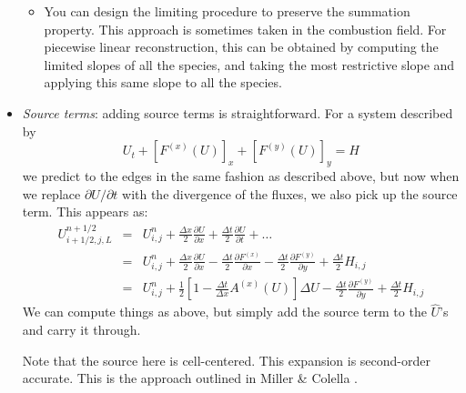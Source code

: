 \begin{itemize}
\begin{itemize}
\item You can design the limiting procedure to preserve the summation
property.  This approach is sometimes taken in the combustion field. 
For piecewise linear reconstruction, this can be obtained by computing
the limited slopes of all the species, and taking the most restrictive
slope and applying this same slope to all the species.
\end{itemize}

\item {\em Source terms}: adding source terms is straightforward.  For
a system described by
\begin{equation}
U_t + [F^{(x)}(U)]_x + [F^{(y)}(U)]_y = H
\end{equation}
we predict to the edges in the same fashion as described above, but now
when we replace $\partial U/\partial t$ with the divergence of the
fluxes, we also pick up the source term.  This appears as:
\begin{eqnarray}
U_{i+1/2,j,L}^{n+1/2} &=& U_{i,j}^n 
            + \frac{\Delta x}{2} \frac{\partial U}{\partial x} 
            + \frac{\Delta t}{2} \frac{\partial U}{\partial t} + \ldots \\
&=& U_{i,j}^n + \frac{\Delta x}{2} \frac{\partial U}{\partial x} 
              - \frac{\Delta t}{2} \frac{\partial F^{(x)}}{\partial x} 
              - \frac{\Delta t}{2} \frac{\partial F^{(y)}}{\partial y} 
              + \frac{\Delta t}{2} H_{i,j} \\
&=& U_{i,j}^n 
 + \frac{1}{2} \left [1 -\frac{\Delta t}{\Delta x} A^{(x)}(U)\right ] \Delta U 
 - \frac{\Delta t}{2} \frac{\partial F^{(y)}}{\partial y}
 + \frac{\Delta t}{2} H_{i,j}
  \label{eq:Utaylorstatesource}
\end{eqnarray}
We can compute things as above, but simply add the source term to the
$\hat{U}$'s and carry it through.  

Note that the source here is cell-centered.  This expansion is
second-order accurate.  This is the approach outlined in Miller 
\& Colella \cite{millercolella:2002}.


\end{itemize}
